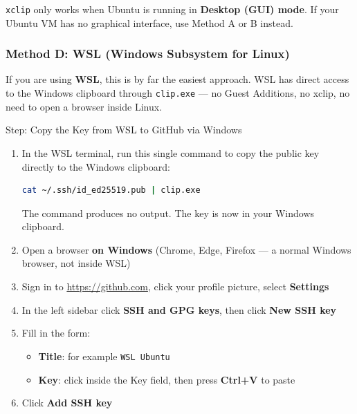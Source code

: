 \documentclass[
    a4paper,
    11pt,
    parskip=half
]{scrartcl}
\begin{document}
\begin{warningbox}
\texttt{xclip} only works when Ubuntu is running in \textbf{Desktop (GUI) mode}. If your Ubuntu VM has no graphical interface, use Method A or B instead.
\end{warningbox}

\subsubsection*{Method D: WSL (Windows Subsystem for Linux)}

If you are using \textbf{WSL}, this is by far the easiest approach. WSL has direct access to the Windows clipboard through \texttt{clip.exe} --- no Guest Additions, no xclip, no need to open a browser inside Linux.

\begin{stepbox}{Step: Copy the Key from WSL to GitHub via Windows}
\begin{enumerate}
    \item In the WSL terminal, run this single command to copy the public key directly to the Windows clipboard:
\begin{lstlisting}[language=bash]
cat ~/.ssh/id_ed25519.pub | clip.exe
\end{lstlisting}
    The command produces no output. The key is now in your Windows clipboard.

    \item Open a browser \textbf{on Windows} (Chrome, Edge, Firefox --- a normal Windows browser, not inside WSL)

    \item Sign in to \url{https://github.com}, click your profile picture, select \textbf{Settings}

    \item In the left sidebar click \textbf{SSH and GPG keys}, then click \textbf{New SSH key}

    \item Fill in the form:
        \begin{itemize}
            \item \textbf{Title}: for example \texttt{WSL Ubuntu}
            \item \textbf{Key}: click inside the Key field, then press \textbf{Ctrl+V} to paste
        \end{itemize}

    \item Click \textbf{Add SSH key}
\end{enumerate}
\end{stepbox}
\end{document}
